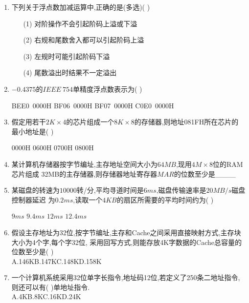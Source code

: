 \documentclass[12pt, a4paper, oneside, UTF8]{ctexbook}
\begin{document}
\begin{enumerate}
    \item \bt 下列关于浮点数加减运算中,正确的是(多选)(    )
    \begin{enumerate}
        \item [(1)] 对阶操作不会引起阶码上溢或下溢 
        \item [(2)] 右规和尾数舍入都可以引起阶码上溢 
        \item [(3)] 左规时可能引起阶码下溢 
        \item [(4)] 尾数溢出时结果不一定溢出 
    \end{enumerate}

    \item \bl $-0.4375$的$IEEE\ 754$单精度浮点数表示为(    ) 
    \begin{choices}
        \task BEE0\ 0000H \task BF06\ 0000H \task BF07\ 0000H \task C0E0\ 0000H
    \end{choices}

    \item \bt 假定用若干$2K\times 4$的芯片组成一个$8K\times 8$的存储器,则地址081FH所在芯片的
    最小地址是(    ) 
    \begin{choices}
        \task 0000H
        \task 0600H
        \task 0700H
        \task 0800H
    \end{choices}
    

    \item \bt 某计算机存储器按字节编址,主存地址空间大小为$64MB$,现用$4M\times 8$位的RAM芯片组成
    32MB的主存储器,则存储器地址寄存器$MAR$的位数至少是\_\_\_\_ 

    \item \bt 某磁盘的转速为$10000$转/分,平均寻道时间是$6ms$,磁盘传输速率是$20MB/s$磁盘控制器延迟
    为$0.2ms$,读取一个$4KB$的扇区所需要的平均时间约为(   ) 
    \begin{choices}
        \task $9ms$
        \task $9.4ms$
        \task $12ms$
        \task $12.4ms$
    \end{choices}
    

    \item \bt 假设主存地址为32位,按字节编址,主存和Cache之间采用直接映射方式,主存块大小为4个字,每个字32位,
    采用回写方式,则能存放4K字数据的Cache总容量的位数至少是(   ) \\
    A.146K\qquad B.147K\qquad C.148K\qquad D.158K 

    \item \bl 一个计算机系统采用32位单字长指令,地址码12位,若定义了250条二地址指令,则还可以有(   )单地址指令. \\
    A.4K\qquad B.8K\qquad C.16K\qquad D.24K 


\end{enumerate}
\end{document}

